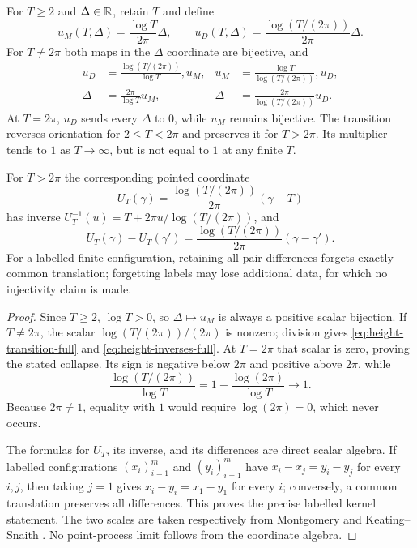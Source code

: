 \begin{theorem}
\label{thm:finite-height-coordinate-transition}
For $T\geq2$ and $\Delta\in\mathbb R$, retain $T$ and define
\[
 u_M(T,\Delta)=\frac{\log T}{2\pi}\Delta,
 \qquad
 u_D(T,\Delta)=\frac{\log(T/(2\pi))}{2\pi}\Delta.
\]
For $T\neq2\pi$ both maps in the $\Delta$ coordinate are bijective, and
\begin{align}
 u_D&=\frac{\log(T/(2\pi))}{\log T},u_M,
 &u_M&=\frac{\log T}{\log(T/(2\pi))},u_D,\label{eq:height-transition-full}\\
 \Delta&=\frac{2\pi}{\log T}u_M,
 &\Delta&=\frac{2\pi}{\log(T/(2\pi))}u_D.\label{eq:height-inverses-full}
\end{align}
At $T=2\pi$, $u_D$ sends every $\Delta$ to $0$, while $u_M$ remains
bijective.  The transition reverses orientation for $2\leq T<2\pi$ and
preserves it for $T>2\pi$.  Its multiplier tends to $1$ as
$T\to\infty$, but is not equal to $1$ at any finite $T$.

For $T>2\pi$ the corresponding pointed coordinate
\[
 U_T(\gamma)=\frac{\log(T/(2\pi))}{2\pi}(\gamma-T)
\]
has inverse
$U_T^{-1}(u)=T+2\pi u/\log(T/(2\pi))$, and
\[
 U_T(\gamma)-U_T(\gamma')
 =\frac{\log(T/(2\pi))}{2\pi}(\gamma-\gamma').
\]
For a labelled finite configuration, retaining all pair differences forgets
exactly common translation; forgetting labels may lose additional data, for
which no injectivity claim is made.
\end{theorem}

\begin{proof}
Since $T\geq2$, $\log T>0$, so $\Delta\mapsto u_M$ is always a positive
scalar bijection.  If $T\neq2\pi$, the scalar
$\log(T/(2\pi))/(2\pi)$ is nonzero; division gives
\eqref{eq:height-transition-full} and \eqref{eq:height-inverses-full}.
At $T=2\pi$ that scalar is zero, proving the stated collapse.  Its sign is
negative below $2\pi$ and positive above $2\pi$, while
\[
 \frac{\log(T/(2\pi))}{\log T}
 =1-\frac{\log(2\pi)}{\log T}\longrightarrow1.
\]
Because $2\pi\neq1$, equality with $1$ would require
$\log(2\pi)=0$, which never occurs.

The formulas for $U_T$, its inverse, and its differences are direct scalar
algebra.  If labelled configurations $(x_i)_{i=1}^m$ and $(y_i)_{i=1}^m$
have $x_i-x_j=y_i-y_j$ for every $i,j$, then taking $j=1$ gives
$x_i-y_i=x_1-y_1$ for every $i$; conversely, a common translation preserves
all differences.  This proves the precise labelled kernel statement.  The two
scales are taken respectively from Montgomery and Keating--Snaith
\cite[pp.~181--182]{montgomery1973}
\cite[eqs.~(8) and~(92)]{keatingSnaith2000}.  No point-process limit follows
from the coordinate algebra.
\end{proof}

